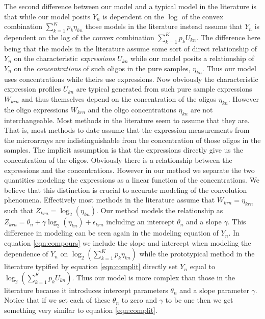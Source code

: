 \documentclass[reqno,12pt,oneside]{report}\usepackage[]{graphicx}\usepackage[]{color}
\theoremstyle{plain}
\theoremstyle{definition}
\theoremstyle{remark}
\numberwithin{theorem}{chapter}     %
\begin{document}
The second difference between our model and a typical model in the literature is that while our model posits $Y_n$ is dependent on the $\log$ of the convex combination $\sum_{k=1}^{K}p_k\eta_{kn}$ those models in the literature instead assume that $Y_n$ is dependent on the log of the convex combination $\sum_{k=1}^{K}p_kU_{kn}$. The difference here being that the models in the literature assume some sort of direct relationship of $Y_n$ on the characteristic \emph{expressions} $U_{kn}$ while our model posits a relationship of $Y_n$ on the \emph{concentrations} of such oligos in the pure samples, $\eta_{kn}$. Thus our model uses concentrations while theirs use expressions.  Now obviously the characteristic expression profiles $U_{kn}$ are typical generated from such pure sample expressions $W_{krn}$ and thus themselves depend on the concentration of the oligos $\eta_{kn}$. However the oligo expressions $W_{krn}$ and the oligo concentrations $\eta_{kn}$ are not interchangeable. Most methods in the literature seem to assume that they are. That is, most methods to date assume that the expression measurements from the microarrays are indistinguishable from the concentration of those oligos in the samples. The implicit assumption is that the expressions directly give us the concentration of the oligos. Obviously there is a relationship between the expressions and the concentrations. However in our method we separate the two quantities modeling the expressions as a linear function of the concentrations. We believe that this distinction is crucial to accurate modeling of the convolution phenomena. Effectively most methods in the literature assume that $W_{krn} = \eta_{krn}$ such that $Z_{krn} = \log_2\left(\eta_{kn}\right)$. Our method models the relationship as $Z_{krn}=\theta_n+\gamma\log_2\left(\eta_{kn}\right)+\epsilon_{krn}$ including an intercept $\theta_n$ and a slope $\gamma$. This difference in modeling can be seen again in the modeling equation of $Y_n$. In equation \ref{eqn:compours} we include the slope and intercept when modeling the dependence of $Y_n$ on $\log_2\left(\sum_{k=1}^{K}p_k\eta_{kn}\right)$ while the prototypical method in the literature typified by equation \ref{eqn:complit} directly set $Y_n$ equal to $\log_2\left(\sum_{k=1}^{K}p_kU_{kn}\right)$. Thus our model is more complex than those in the literature because it introduces intercept parameters $\theta_n$ and a slope parameter $\gamma$. Notice that if we set each of these $\theta_n$ to zero and $\gamma$ to be one then we get something very similar to equation \ref{eqn:complit}.
\end{document}
